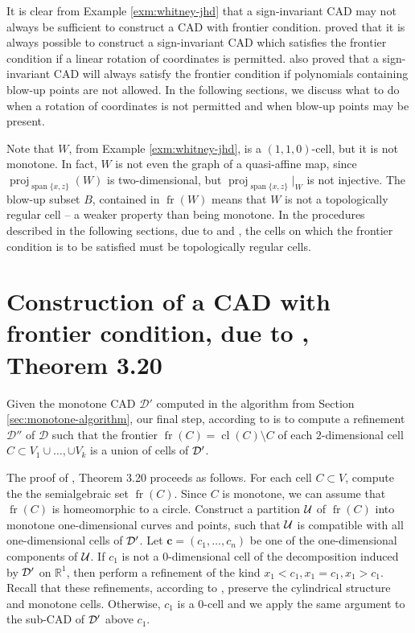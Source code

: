 \documentclass[
]{book}
\theoremstyle{definition}
\theoremstyle{definition}
\theoremstyle{definition}
\theoremstyle{definition}
\theoremstyle{remark}
\begin{document}
It is clear from Example \ref{exm:whitney-jhd} that a sign-invariant CAD may not always be sufficient to construct a CAD with frontier condition. \citet{pianomovers1983} proved that it is always possible to construct a sign-invariant CAD which satisfies the frontier condition if a linear rotation of coordinates is permitted. \citet{jhd20} also proved that a sign-invariant CAD will always satisfy the frontier condition if polynomials containing blow-up points are not allowed. In the following sections, we discuss what to do when a rotation of coordinates is not permitted and when blow-up points may be present.

Note that \(W\), from Example \ref{exm:whitney-jhd}, is a \((1,1,0)\)-cell, but it is not monotone. In fact, \(W\) is not even the graph of a quasi-affine map, since \({\operatorname{proj}_{{\operatorname{span} \{x,z\}}}}(W)\) is two-dimensional, but \({\operatorname{proj}_{{\operatorname{span} \{x,z\}}}}\vert_W\) is not injective. The blow-up subset \(B\), contained in \({\operatorname{fr} \left( W \right)}\) means that \(W\) is not a topologically regular cell -- a weaker property than being monotone.
In the procedures described in the following sections, due to \citet{bgv15} and \citet{lazard10}, the cells on which the frontier condition is to be satisfied must be topologically regular cells.

\hypertarget{sec:frontier-bgv}{%
\section{\texorpdfstring{Construction of a CAD with frontier condition, due to \citet{bgv15}, Theorem 3.20}{Construction of a CAD with frontier condition, due to @bgv15, Theorem 3.20}}\label{sec:frontier-bgv}}

Given the monotone CAD \(\mathcal{D'}\) computed in the algorithm from Section \ref{sec:monotone-algorithm}, our final step, according to \citep[Theorem 3.20]{bgv15} is to compute a refinement \(\mathcal{D''}\) of \(\mathcal{D}\) such that the frontier \({\operatorname{fr} \left( C \right)} = {\operatorname{cl} \left( C \right)} \setminus C\) of each \(2\)-dimensional cell \(C \subset V_1\cup \ldots, \cup V_k\) is a union of cells of \(\cal D'\).

The proof of \citet{bgv15}, Theorem 3.20 proceeds as follows. For each cell \(C \subset V\), compute the the semialgebraic set \({\operatorname{fr} \left( C \right)}\). Since \(C\) is monotone, we can assume that \({\operatorname{fr} \left( C \right)}\) is homeomorphic to a circle. Construct a partition \(\cal U\) of \({\operatorname{fr} \left( C \right)}\) into monotone one-dimensional curves and points, such that \(\cal U\) is compatible with all one-dimensional cells of \(\cal D'\).
Let \(\mathbf{c} = (c_1,\ldots,c_n)\) be one of the one-dimensional components of \(\cal U\). If \(c_1\) is not a \(0\)-dimensional cell of the decomposition induced by \(\cal D'\) on \(\mathbb{R}^1\), then perform a refinement of the kind \(x_1 < c_1, x_1 = c_1, x_1 > c_1\). Recall that these refinements, according to \citep[Lemma 3,11]{bgv15}, preserve the cylindrical structure and monotone cells. Otherwise, \(c_1\) is a \(0\)-cell and we apply the same argument to the sub-CAD of \(\cal D'\) above \(c_1\).
\end{document}
